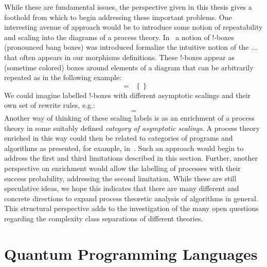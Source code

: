 While these are fundamental issues, the perspective given in this thesis gives a foothold from which to begin addressing these important problems. One interesting avenue of approach would be to introduce some notion of repeatability and scaling into the diagrams of a process theory. In~\cite{kissinger2012pictures,kissinger2015tensors} a notion of !-boxes (pronounced bang boxes) was introduced formalize the intuitive notion of the $...$ that often appears in our morphisms definitions. These !-boxes appear as (sometime colored) boxes around elements of a diagram that can be arbitrarily repeated as in the following example:
\begin{equation}

\;=\;\;
\left\{  \right\}
\end{equation}
We could imagine labelled !-boxes with different asymptotic scalings and their own set of rewrite rules, e.g.:
\begin{equation}

\;=\;

\end{equation}
Another way of thinking of these scaling labels is as an enrichment of a process theory in some suitably defined \emph{category of asymptotic scalings}. A process theory enriched in this way could then be related to categories of programs and algorithms as presented, for example, in~\cite{yanofsky2010towards}. Such an approach would begin to address the first and third limitations described in this section. Further, another perspective on enrichment would allow the labelling of processes with their success probability, addressing the second limitation. While these are still speculative ideas, we hope this indicates that there are many different and concrete directions to expand process theoretic analysis of algorithms in general. This structural perspective adds to the investigation of the many open questions regarding the complexity class separations of different theories.

\section{Quantum Programming Languages}

